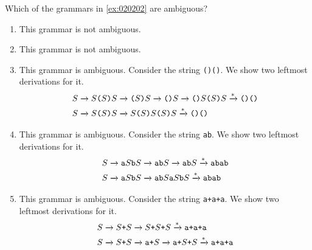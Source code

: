 \begin{exercise}\label{ex:020203}
    Which of the grammars in \cref{ex:020202} are ambiguous?
\end{exercise}
\begin{solution}\label{sol:020203}
    \begin{enumerate}
        \item This grammar is not ambiguous.
        \item This grammar is not ambiguous.
        \item This grammar is ambiguous. Consider the string \texttt{()()}.
        We show two leftmost derivations for it.
        \begin{align*}
            S &\xrightarrow{} S\texttt{(}S\texttt{)}S \xrightarrow{} \texttt{(}S\texttt{)}S \xrightarrow{} \texttt{()}S \xrightarrow{} \texttt{()}S\texttt{(}S\texttt{)}S \xrightarrow{*} \texttt{()()} \\
            S &\xrightarrow{} S\texttt{(}S\texttt{)}S \xrightarrow{} S\texttt{(}S\texttt{)}S\texttt{(}S\texttt{)}S \xrightarrow{*} \texttt{()()}
        \end{align*}
        \item This grammar is ambiguous. Consider the string \texttt{ab}.
        We show two leftmost derivations for it.
        \begin{align*}
            S &\xrightarrow{} \texttt{a}S\texttt{b}S \xrightarrow{} \texttt{ab}S \xrightarrow{} \texttt{ab}S \xrightarrow{*} \texttt{abab} \\
            S &\xrightarrow{} \texttt{a}S\texttt{b}S \xrightarrow{} \texttt{ab}S\texttt{a}S\texttt{b}S \xrightarrow{*} \texttt{abab}
        \end{align*}
        \item This grammar is ambiguous. Consider the string \texttt{a+a+a}.
        We show two leftmost derivations for it.
        \begin{align*}
            S &\xrightarrow{} S\texttt{+}S \xrightarrow{} S\texttt{+}S\texttt{+}S \xrightarrow{*} \texttt{a+a+a} \\
            S &\xrightarrow{} S\texttt{+}S \xrightarrow{} \texttt{a+}S \xrightarrow{} \texttt{a+}S\texttt{+}S \xrightarrow{*} \texttt{a+a+a}
        \end{align*}
    \end{enumerate}
\end{solution}